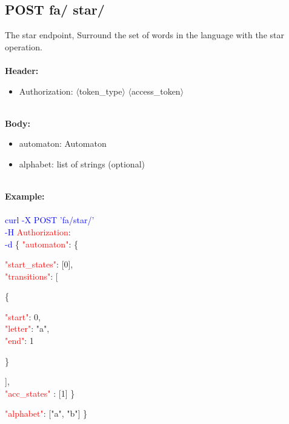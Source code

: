 \subsection{POST fa/ star/}
The star endpoint, Surround the set of words in the language with the star operation. \\
\ \\
\textbf{Header:}
\begin{itemize}
    \item Authorization: $\langle$token\_type$\rangle$ $\langle$access\_token$\rangle$
\end{itemize}
\ \\
\textbf{Body:}
\begin{itemize}
    \item automaton: Automaton
    \item alphabet: list of strings (optional)
\end{itemize}
\ \\
\textbf{Example:} \\
\ \\
\textcolor{blue}{curl -X POST '\BaseURL fa/star/'\\
-H} \textcolor{red}{Authorization}: \Auth \\
\textcolor{blue}{-d} \{ 
     \textcolor{red}{"automaton"}: \{
     \begin{adjustwidth}{7.5 mm}{0 cm}
     \begin{adjustwidth}{7.5 mm}{0 cm}
            \textcolor{red}{"start\_states"}: [0],\\
            \textcolor{red}{"transitions"}: [
            \begin{adjustwidth}{7.5 mm}{0 cm}
            \{
               \begin{adjustwidth}{7.5 mm}{0 cm}
                    \textcolor{red}{"start"}: 0,\\
                    \textcolor{red}{"letter"}: "a",\\
                    \textcolor{red}{"end"}: 1
               \end{adjustwidth}
            \}
            \end{adjustwidth}
            ],\\
        \textcolor{red}{"acc\_states" }: [1]  \}
    \end{adjustwidth}
    \end{adjustwidth}
   \begin{adjustwidth}{7.5 mm}{0 cm}
    \textcolor{red}{"alphabet"}: ["a", "b"] \}
    \end{adjustwidth}
